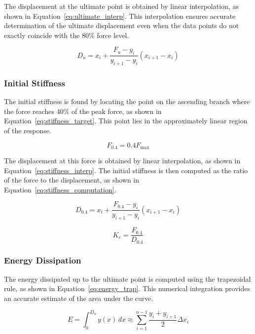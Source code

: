\documentclass[11pt,a4paper]{article}
\begin{document}
The displacement at the ultimate point is obtained by linear interpolation, as shown in Equation~\ref{eq:ultimate_interp}. This interpolation ensures accurate determination of the ultimate displacement even when the data points do not exactly coincide with the 80\% force level.

\begin{equation}
D_u = x_i + \frac{F_u - y_i}{y_{i+1} - y_i} (x_{i+1} - x_i)
\label{eq:ultimate_interp}
\end{equation}

\subsubsection{Initial Stiffness}

The initial stiffness is found by locating the point on the ascending branch where the force reaches 40\% of the peak force, as shown in Equation~\ref{eq:stiffness_target}. This point lies in the approximately linear region of the response.

\begin{equation}
F_{0.4} = 0.4 F_{\max}
\label{eq:stiffness_target}
\end{equation}

The displacement at this force is obtained by linear interpolation, as shown in Equation~\ref{eq:stiffness_interp}. The initial stiffness is then computed as the ratio of the force to the displacement, as shown in Equation~\ref{eq:stiffness_computation}.

\begin{equation}
D_{0.4} = x_i + \frac{F_{0.4} - y_i}{y_{i+1} - y_i} (x_{i+1} - x_i)
\label{eq:stiffness_interp}
\end{equation}

\begin{equation}
K_e = \frac{F_{0.4}}{D_{0.4}}
\label{eq:stiffness_computation}
\end{equation}

\subsubsection{Energy Dissipation}

The energy dissipated up to the ultimate point is computed using the trapezoidal rule, as shown in Equation~\ref{eq:energy_trap}. This numerical integration provides an accurate estimate of the area under the curve.

\begin{equation}
E = \int_0^{D_u} y(x) \, dx \approx \sum_{i=1}^{n-1} \frac{y_i + y_{i+1}}{2} \Delta x_i
\label{eq:energy_trap}
\end{equation}
\end{document}

